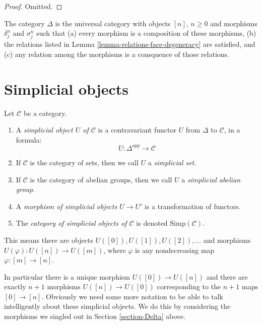 \begin{proof}
Omitted.
\end{proof}

\begin{lemma}
\label{lemma-face-degeneracy-category}
The category $\Delta$ is the universal category
with objects $[n]$, $n \geq 0$ and morphisms
$\delta^n_j$ and $\sigma^n_j$ such that (a) every morphism is
a composition of these morphisms, (b) the relations
listed in Lemma \ref{lemma-relations-face-degeneracy} are satisfied,
and (c) any relation among the morphisms is a consquence of
those relations.
\end{lemma}







\section{Simplicial objects}
\label{section-simplicial-object}

\begin{definition}
\label{definition-simplicial-object}
Let $\mathcal{C}$ be a category.
\begin{enumerate}
\item A {\it simplicial object $U$ of $\mathcal{C}$}
is a contravariant functor $U$ from $\Delta$ to
$\mathcal{C}$, in a formula:
$$
U : \Delta^{opp} \longrightarrow \mathcal{C}
$$
\item If $\mathcal{C}$ is the category of sets, then we call
$U$ a {\it simplicial set}.
\item If $\mathcal{C}$ is the category of abelian groups,
then we call $U$ a {\it simplicial abelian group}.
\item A {\it morphism of simplicial objects $U \to U'$}
is a transformation of functors.
\item The {\it category of simplicial objects of $\mathcal{C}$}
is denoted $\text{Simp}(\mathcal{C})$.
\end{enumerate}
\end{definition}

\noindent
This means there are objects $U([0]), U([1]), U([2]), \ldots$
and morphisms $U(\varphi) : U([n]) \to U([m])$,
where $\varphi$ is any nondecreasing map $\varphi : [m] \to [n]$. 

\medskip\noindent
In particular there is a unique morphism $U([0]) \to U([n])$ and there are
exactly $n + 1$ morphisms $U([n]) \to U([0])$ corresponding to
the $n + 1$ maps $[0] \to [n]$. Obviously we need some more notation
to be able to talk 
intelligently about these simplicial objects. We do this by considering
the morphisms we singled out in Section \ref{section-Delta} above.

